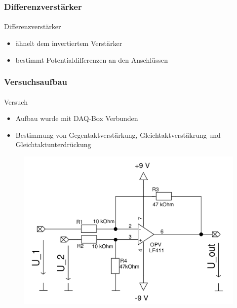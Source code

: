 \begin{frame}
    \frametitle{Differenzverstärker}
    \framesubtitle{}
%    
    \begin{block}{Differenzverstärker}
        \begin{itemize}
            \item ähnelt dem invertiertem Verstärker
            \item bestimmt Potentialdifferenzen an den Anschlüssen
        \end{itemize}
    \end{block}
\end{frame}
\begin{frame}
\frametitle{Versuchsaufbau}
\framesubtitle{}
    \begin{block}{Versuch}
        \begin{itemize}
            \item Aufbau wurde mit DAQ-Box Verbunden
            \item Bestimmung von Gegentaktverstärkung, Gleichtaktverstäkrung
            und Gleichtaktunterdrückung
        \end{itemize}    
    \end{block}
    \begin{figure}[H]
    \begin{center}
            \includegraphics[scale=0.2]{./img/schaltung/dif_verst_1.png}
    \end{center}
    \end{figure}
\end{frame}
